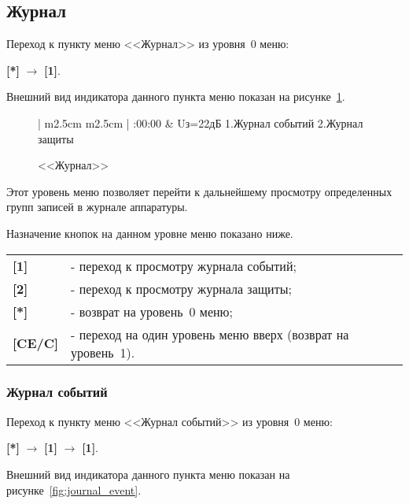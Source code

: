 \subsection{Журнал}	\label{ssec:journal}

Переход к пункту меню <<Журнал>> из уровня~0 меню:

\textbf{[*]} $\rightarrow$ \textbf{[1]}.

Внешний вид индикатора данного пункта меню показан на рисунке~\ref{fig:journal}.

 \begin{figure}[H]
 	\centering 
 	
	\begin{tabular}{| m{2.5cm}  m{2.5cm} |}
		:00:00	& \raggedleft Uз=22дБ		\tabularnewline
		 {1.Журнал событий} \tabularnewline
		 {2.Журнал защиты}	\tabularnewline
		 {} 				\tabularnewline
		\lasthline
	\end{tabular}

	\caption{<<Журнал>>}
	\label{fig:journal}
\end{figure}

Этот уровень меню позволяет перейти к дальнейшему просмотру определенных групп записей в журнале аппаратуры.

Назначение кнопок на данном уровне меню показано ниже.
\begin{center}
	\begin{tabular}{p{2cm} p{15cm}}
		\textbf{[1]} & - переход к просмотру журнала событий; \tabularnewline
		\textbf{[2]} & - переход к просмотру журнала защиты; \tabularnewline
		\textbf{[*]} & - возврат на уровень~0 меню; \tabularnewline
		\textbf{[CE/C]} & - переход на один уровень меню вверх (возврат на уровень~1). \tabularnewline
	\end{tabular}
\end{center}


\subsubsection{Журнал событий}	\label{sssec:journal_event}

Переход к пункту меню <<Журнал событий>> из уровня~0 меню: 

\textbf{[*]} $\rightarrow$ \textbf{[1]} $\rightarrow$ \textbf{[1]}.

Внешний вид индикатора данного пункта меню показан на рисунке~\ref{fig:journal_event}.
 
